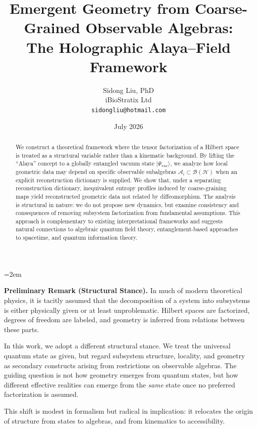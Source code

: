 \documentclass[12pt,a4paper]{article}
\title{Emergent Geometry from Coarse-Grained Observable Algebras:\\
The Holographic Alaya--Field Framework}
\author{
  Sidong Liu, PhD \\[0.6ex]
  iBioStratix Ltd \\[0.8ex]
  \texttt{sidongliu@hotmail.com}
}
\date{July 2026}
\begin{document}
\emergencystretch=2em
\raggedbottom
{}

\maketitle

\noindent\textbf{Preliminary Remark (Structural Stance).}
In much of modern theoretical physics, it is tacitly assumed that the decomposition of a system into subsystems is either physically given or at least unproblematic. 
Hilbert spaces are factorized, degrees of freedom are labeled, and geometry is inferred from relations between these parts.

In this work, we adopt a different structural stance. 
We treat the universal quantum state as given, but regard subsystem structure, locality, and geometry as secondary constructs arising from restrictions on observable algebras. 
The guiding question is not how geometry emerges from quantum states, but how different effective realities can emerge from the \emph{same} state once no preferred factorization is assumed.

This shift is modest in formalism but radical in implication: it relocates the origin of structure from states to algebras, and from kinematics to accessibility.

\medskip

\begin{abstract}
We construct a theoretical framework where the tensor factorization of a Hilbert space is treated as a structural variable rather than a kinematic background. 
By lifting the ``Alaya'' concept to a globally entangled vacuum state $|\Psi_{\text{vac}}\rangle$, we analyze how local geometric data may depend on specific observable subalgebras $\mathcal{A}_i \subset \mathcal{B}(\mathcal{H})$ when an explicit reconstruction dictionary is supplied. 
We show that, under a separating reconstruction dictionary, inequivalent entropy profiles induced by coarse-graining maps yield reconstructed geometric data not related by diffeomorphism.
The analysis is structural in nature: we do not propose new dynamics, but examine consistency and consequences of removing subsystem factorization from fundamental assumptions. 
This approach is complementary to existing interpretational frameworks and suggests natural connections to algebraic quantum field theory, entanglement-based approaches to spacetime, and quantum information theory.
\end{abstract}
\end{document}

